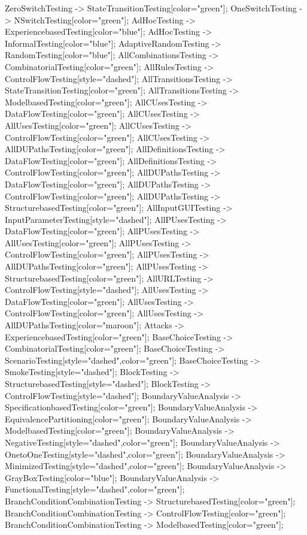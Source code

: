 \documentclass{article}
\begin{document}
{ZeroSwitchTesting -> StateTransitionTesting[color="green"];
OneSwitchTesting -> NSwitchTesting[color="green"];
AdHocTesting -> ExperiencebasedTesting[color="blue"];
AdHocTesting -> InformalTesting[color="blue"];
AdaptiveRandomTesting -> RandomTesting[color="blue"];
AllCombinationsTesting -> CombinatorialTesting[color="green"];
AllRulesTesting -> ControlFlowTesting[style="dashed"];
AllTransitionsTesting -> StateTransitionTesting[color="green"];
AllTransitionsTesting -> ModelbasedTesting[color="green"];
AllCUsesTesting -> DataFlowTesting[color="green"];
AllCUsesTesting -> AllUsesTesting[color="green"];
AllCUsesTesting -> ControlFlowTesting[color="green"];
AllCUsesTesting -> AllDUPathsTesting[color="green"];
AllDefinitionsTesting -> DataFlowTesting[color="green"];
AllDefinitionsTesting -> ControlFlowTesting[color="green"];
AllDUPathsTesting -> DataFlowTesting[color="green"];
AllDUPathsTesting -> ControlFlowTesting[color="green"];
AllDUPathsTesting -> StructurebasedTesting[color="green"];
AllInputGUITesting -> InputParameterTesting[style="dashed"];
AllPUsesTesting -> DataFlowTesting[color="green"];
AllPUsesTesting -> AllUsesTesting[color="green"];
AllPUsesTesting -> ControlFlowTesting[color="green"];
AllPUsesTesting -> AllDUPathsTesting[color="green"];
AllPUsesTesting -> StructurebasedTesting[color="green"];
AllURLTesting -> ControlFlowTesting[style="dashed"];
AllUsesTesting -> DataFlowTesting[color="green"];
AllUsesTesting -> ControlFlowTesting[color="green"];
AllUsesTesting -> AllDUPathsTesting[color="maroon"];
Attacks -> ExperiencebasedTesting[color="green"];
BaseChoiceTesting -> CombinatorialTesting[color="green"];
BaseChoiceTesting -> ScenarioTesting[style="dashed",color="green"];
BaseChoiceTesting -> SmokeTesting[style="dashed"];
BlockTesting -> StructurebasedTesting[style="dashed"];
BlockTesting -> ControlFlowTesting[style="dashed"];
BoundaryValueAnalysis -> SpecificationbasedTesting[color="green"];
BoundaryValueAnalysis -> EquivalencePartitioning[color="green"];
BoundaryValueAnalysis -> ModelbasedTesting[color="green"];
BoundaryValueAnalysis -> NegativeTesting[style="dashed",color="green"];
BoundaryValueAnalysis -> OnetoOneTesting[style="dashed",color="green"];
BoundaryValueAnalysis -> MinimizedTesting[style="dashed",color="green"];
BoundaryValueAnalysis -> GrayBoxTesting[color="blue"];
BoundaryValueAnalysis -> FunctionalTesting[style="dashed",color="green"];
BranchConditionCombinationTesting -> StructurebasedTesting[color="green"];
BranchConditionCombinationTesting -> ControlFlowTesting[color="green"];
BranchConditionCombinationTesting -> ModelbasedTesting[color="green"];
}
\end{document}
